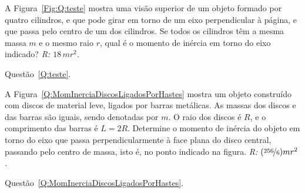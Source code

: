 \begin{question}[type={exam}]\label{Q:teste}
A Figura~\ref{Fig:Q:teste} mostra uma visão superior de um objeto formado por quatro cilindros, e que pode girar em torno de um eixo perpendicular à página, e que passa pelo centro de um dos cilindros. Se todos os cilindros têm a mesma massa $m$ e o mesmo raio $r$, qual é o momento de inércia em torno do eixo indicado? {\it R: $18\,mr^2$.}

\begin{marginfigure}[-1cm]
\centering
{}
\caption{Questão~\ref{Q:teste}.\label{Fig:Q:teste}}
\end{marginfigure}
\end{question}

\begin{question}[type={exam}]\label{Q:MomInerciaDiscosLigadosPorHastes}
A Figura~\ref{Q:MomInerciaDiscosLigadosPorHastes} mostra um objeto construído com discos de material leve, ligados por barras metálicas. As massas dos discos e das barras são iguais, sendo denotadas por $m$. O raio dos discos é $R$, e o comprimento das barras é $L = 2R$. Determine o momento de inércia do objeto em torno do eixo que passa perpendicularmente à face plana do disco central, passando pelo centro de massa, isto é, no ponto indicado na figura. {\it R: $(\nicefrac{256}{6}) mr^2$.}
\begin{marginfigure}[-3cm]
\centering
{}
\caption{Questão~\ref{Q:MomInerciaDiscosLigadosPorHastes}. \label{Fig:Q:MomInerciaDiscosLigadosPorHastes}}
\end{marginfigure}
\end{question}

